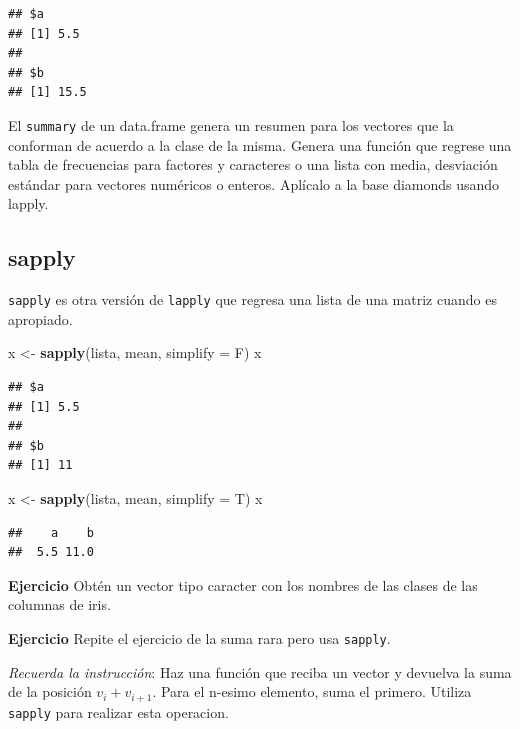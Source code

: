 \documentclass[]{article}
\newenvironment{Shaded}{\begin{snugshade}}{\end{snugshade}}
\newcommand{\KeywordTok}[1]{\textcolor[rgb]{0.13,0.29,0.53}{\textbf{{#1}}}}
\newcommand{\DataTypeTok}[1]{\textcolor[rgb]{0.13,0.29,0.53}{{#1}}}
\newcommand{\StringTok}[1]{\textcolor[rgb]{0.31,0.60,0.02}{{#1}}}
\newcommand{\NormalTok}[1]{{#1}}
\begin{document}
\begin{verbatim}
## $a
## [1] 5.5
## 
## $b
## [1] 15.5
\end{verbatim}

El \texttt{summary} de un data.frame genera un resumen para los vectores
que la conforman de acuerdo a la clase de la misma. Genera una función
que regrese una tabla de frecuencias para factores y caracteres o una
lista con media, desviación estándar para vectores numéricos o enteros.
Aplícalo a la base diamonds usando lapply.

\subsection{sapply}\label{sapply}

\texttt{sapply} es otra versión de \texttt{lapply} que regresa una lista
de una matriz cuando es apropiado.

\begin{Shaded}
\begin{Highlighting}[]
\NormalTok{x <-}\StringTok{ }\KeywordTok{sapply}\NormalTok{(lista, mean, }\DataTypeTok{simplify =} \NormalTok{F)}
\NormalTok{x}
\end{Highlighting}
\end{Shaded}

\begin{verbatim}
## $a
## [1] 5.5
## 
## $b
## [1] 11
\end{verbatim}

\begin{Shaded}
\begin{Highlighting}[]
\NormalTok{x <-}\StringTok{ }\KeywordTok{sapply}\NormalTok{(lista, mean, }\DataTypeTok{simplify =} \NormalTok{T)}
\NormalTok{x}
\end{Highlighting}
\end{Shaded}

\begin{verbatim}
##    a    b 
##  5.5 11.0
\end{verbatim}

\textbf{Ejercicio} Obtén un vector tipo caracter con los nombres de las
clases de las columnas de iris.

\textbf{Ejercicio} Repite el ejercicio de la suma rara pero usa
\texttt{sapply}.

\emph{Recuerda la instrucción}: Haz una función que reciba un vector y
devuelva la suma de la posición $v_i + v_{i + 1}$. Para el n-esimo
elemento, suma el primero. Utiliza \texttt{sapply} para realizar esta
operacion.
\end{document}
